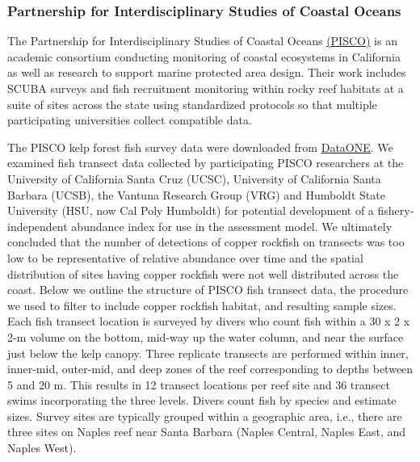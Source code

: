\documentclass[11pt,
  english,
  letterpaper,
]{article}
\begin{document}
\hypertarget{partnership-for-interdisciplinary-studies-of-coastal-oceans}{%
\subsubsection{Partnership for Interdisciplinary Studies of Coastal Oceans}\label{partnership-for-interdisciplinary-studies-of-coastal-oceans}}

The Partnership for Interdisciplinary Studies of Coastal Oceans \href{https://www.piscoweb.org/}{(PISCO)} is an academic consortium conducting monitoring of coastal ecosystems in California as well as research to support marine protected area design. Their work includes SCUBA surveys and fish recruitment monitoring within rocky reef habitats at a suite of sites across the state using standardized protocols so that multiple participating universities collect compatible data.

The PISCO kelp forest fish survey data were downloaded from \href{https://www.dataone.org/}{DataONE}. We examined fish transect data collected by participating PISCO researchers at the University of California Santa Cruz (UCSC), University of California Santa Barbara (UCSB), the Vantuna Research Group (VRG) and Humboldt State University (HSU, now Cal Poly Humboldt) for potential development of a fishery-independent abundance index for use in the assessment model. We ultimately concluded that the number of detections of copper rockfish on transects was too low to be representative of relative abundance over time and the spatial distribution of sites having copper rockfish were not well distributed across the coast. Below we outline the structure of PISCO fish transect data, the procedure we used to filter to include copper rockfish habitat, and resulting sample sizes. Each fish transect location is surveyed by divers who count fish within a 30 x 2 x 2-m volume on the bottom, mid-way up the water column, and near the surface just below the kelp canopy. Three replicate transects are performed within inner, inner-mid, outer-mid, and deep zones of the reef corresponding to depths between 5 and 20 m. This results in 12 transect locations per reef site and 36 transect swims incorporating the three levels. Divers count fish by species and estimate sizes. Survey sites are typically grouped within a geographic area, i.e., there are three sites on Naples reef near Santa Barbara (Naples Central, Naples East, and Naples West).
\end{document}
